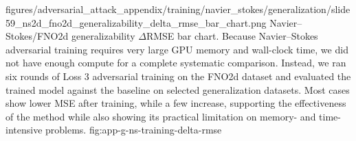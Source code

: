 \documentclass[letterpaper]{article} %
\newcounter{appendixsection}
\newcounter{appendixsubsection}[appendixsection]
\newcounter{appendixdomain}[appendixsubsection]
\begin{document}
\FloatBarrier
{}

\appendixattackfig
  {figures/adversarial_attack_appendix/training/navier_stokes/generalization/slide59_ns2d_fno2d_generalizability_delta_rmse_bar_chart.png}
  {Navier--Stokes/FNO2d generalizability $\Delta$RMSE bar chart. Because
  Navier--Stokes adversarial training requires very large GPU memory and
  wall-clock time, we did not have enough compute for a complete systematic
  comparison. Instead, we ran six rounds of Loss 3 adversarial training on the
  FNO2d dataset and evaluated the trained model against the baseline on selected
  generalization datasets. Most cases show lower MSE after training, while a few
  increase, supporting the effectiveness of the method while also showing its
  practical limitation on memory- and time-intensive problems.}
  {fig:app-g-ns-training-delta-rmse}

\endgroup
\end{document}
